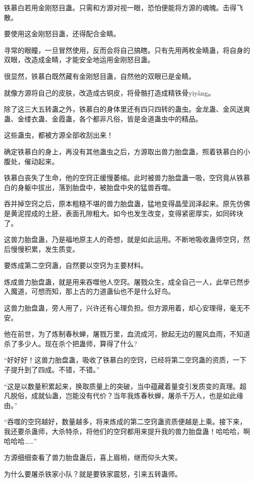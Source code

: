 \begin{this_body}
铁慕白若用金刚怒目蛊。只需和方源对视一眼，恐怕便能将方源的魂魄。击得飞散。

要使用这金刚怒目蛊，还得配合金睛。

寻常的眼瞳，一旦冒然使用，反而会将自己搞瞎。只有先用两枚金睛蛊，将自身的双眼，改造成金睛，才能安全地运用金刚怒目蛊。

很显然，铁慕白既然藏有金刚怒目蛊，自然他的双眼已是金睛。

就像方源将自己的皮肤，改造成古铜皮，将骨骼打造成精铁骨yiyàng。

除了这三大五转蛊之外，铁慕白的身体里还有四只四转的蛊虫。金龙蛊、金风送爽蛊、金缕衣蛊、金霞蛊，各个都非凡俗，皆是金道蛊虫中的精品。

这些蛊虫，都被方源全部收刮出来！

确定铁慕白的身上，再没有其他蛊虫之后，方源取出兽力胎盘蛊，照着铁慕白的小腹处，催动起来。

铁慕白丧失了生命，他的空窍正缓慢萎缩。此时被兽力胎盘蛊一吸，空窍竟从铁慕白的身躯中拔出，落到胎盘中，被胎盘中央的猛兽吞噬。

吞并掉空窍之后，原本粗糙不堪的兽力胎盘蛊，猛地变得晶莹润泽起来。原先仿佛是黄泥捏成的土胚，表面孔隙粗大。如今也发生改变，变得紧密厚实，如同砖块了。

这兽力胎盘蛊，乃是福地原主人的奇想，就是如此运用。不断地吸收蛊师空窍，然后慢慢积累，发生质变。

要炼成第二空窍蛊，自然要以空窍为主要材料。

炼成兽力胎盘蛊，就是用来吞噬他人空窍。屠戮众生，成全自己一人，此举已然步入魔道，可想而知，那上古的力道蛊仙也不是什么好鸟。

这兽力胎盘蛊，旁人用了，兴许还有心理负担。但方源用着，却心安理得，毫无不安。

他在前世，为了炼制春秋蝉，屠戮万里，血流成河，掀起无边的腥风血雨，不知道杀了多少人。现在杀个把蛊师，算得了什么?

“好好好！这兽力胎盘蛊，吸收了铁慕白的空窍，已经将第二空窍蛊的资质，一下子提升到了四成。不错，不错。”

“这是以数量积累起来，换取质量上的突破，当中蕴藏着量变引发质变的真理。超凡脱俗，成就仙蛊，岂能没有代价？当年我炼春秋蝉，屠杀千万人，也是如此缘由。”

“吞噬的空窍越好，数量越多，将来炼成的第二空窍蛊资质便越是上乘。接下来，我还要杀蛊师，大杀特杀，将他们的空窍都用来提升我的兽力胎盘蛊！哈哈哈，啊哈哈哈……”

方源细细查看了兽力胎盘蛊后，喜上眉梢，继而仰头大笑。

为什么要屠杀铁家小队？就是要铁家震怒，引来五转蛊师。


\end{this_body}
